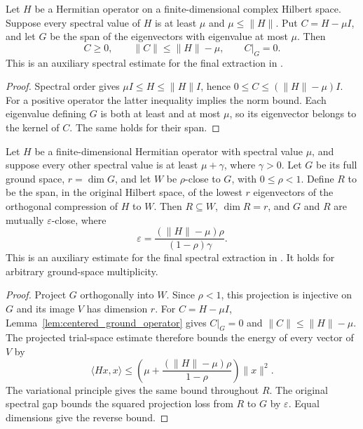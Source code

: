 \begin{lemma}
    \label{lem:centered_ground_operator}
    \leanok
    Let $H$ be a Hermitian operator on a finite-dimensional complex Hilbert
    space. Suppose every spectral value of $H$ is at least $\mu$ and
    $\mu\le\|H\|$. Put $C=H-\mu I$, and let $G$ be the span of the
    eigenvectors with eigenvalue at most $\mu$. Then
    \[
        C\ge0,\qquad \|C\|\le\|H\|-\mu,\qquad C|_G=0.
    \]
    This is an auxiliary spectral estimate for the final extraction in
    \cite[Figure~\texttt{fig:algo1}, lines 1633--1640]{Arad2016RigorousRG}.
\end{lemma}
\begin{proof}\leanok
    Spectral order gives $\mu I\le H\le\|H\|I$, hence
    $0\le C\le(\|H\|-\mu)I$. For a positive operator the latter inequality
    implies the norm bound. Each eigenvalue defining $G$ is both at least
    and at most $\mu$, so its eigenvector belongs to the kernel of $C$.
    The same holds for their span.
\end{proof}

\begin{theorem}
    \label{thm:ritz_ground_space_of_closeness}
    \leanok
    Let $H$ be a finite-dimensional Hermitian operator with spectral value
    $\mu$, and suppose every other spectral value is at least
    $\mu+\gamma$, where $\gamma>0$. Let $G$ be its full ground space,
    $r=\dim G$, and let $W$ be $\rho$-close to $G$, with $0\le\rho<1$.
    Define $R$ to be the span, in the original Hilbert space, of the lowest
    $r$ eigenvectors of the orthogonal compression of $H$ to $W$.
    Then $R\subseteq W$, $\dim R=r$, and $G$ and $R$ are mutually
    $\varepsilon$-close, where
    \[
        \varepsilon=
        \frac{(\|H\|-\mu)\rho}{(1-\rho)\gamma}.
    \]
    This is an auxiliary estimate for the final spectral extraction in
    \cite[Figure~\texttt{fig:algo1}, lines 1633--1640]{Arad2016RigorousRG}.
    It holds for arbitrary ground-space
    multiplicity.
\end{theorem}
\begin{proof}\leanok
    Project $G$ orthogonally into $W$. Since $\rho<1$, this projection is
    injective on $G$ and its image $V$ has dimension $r$.
    For $C=H-\mu I$, Lemma~\ref{lem:centered_ground_operator} gives
    $C|_G=0$ and $\|C\|\le\|H\|-\mu$. The projected trial-space estimate
    therefore bounds the energy of every vector of $V$ by
    \[
        \langle Hx,x\rangle\le
        \left(\mu+\frac{(\|H\|-\mu)\rho}{1-\rho}\right)\|x\|^2.
    \]
    The variational principle gives the same bound throughout $R$.
    The original spectral gap bounds the squared projection loss from $R$
    to $G$ by $\varepsilon$. Equal dimensions give the reverse bound.
\end{proof}

